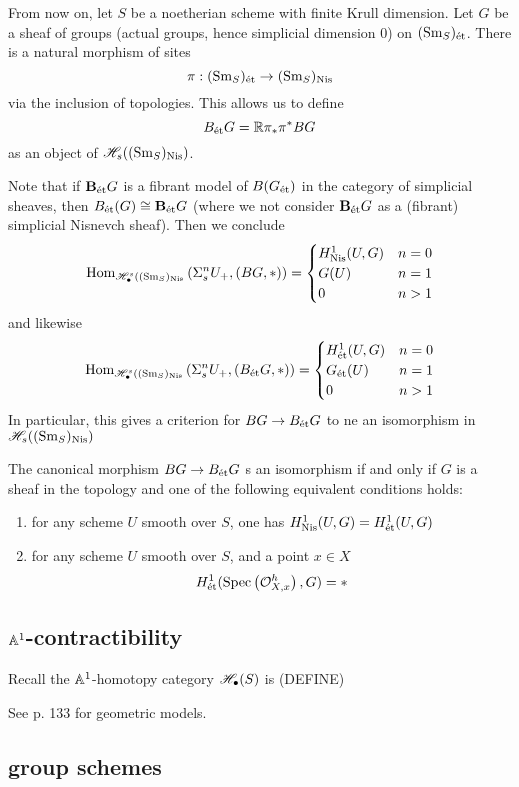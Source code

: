 \documentclass[12pt]{article}
\begin{document}
From now on, let $S$ be a noetherian scheme with finite Krull dimension. Let $G$ be a sheaf of groups (actual groups, hence simplicial dimension $0$) on $(\mathrm{Sm}_S)_{\text{\'{e}t}}$. There is a natural morphism of sites
\[ \pi: (\mathrm{Sm}_S)_{\text{\'{e}t}} \to (\mathrm{Sm}_S)_{\mathrm{Nis}} \]
via the inclusion of topologies. This allows us to define
\[ B_{\text{\'{e}t}} G = \mathbb{R} \pi_* \pi^* BG \]
as an object of $\mathscr{H}_s((\mathrm{Sm}_S)_{\mathrm{Nis}})$.
\par 
Note that if $\mathbf{B}_{\text{\'{e}t}} G$ is a fibrant model of $B(G_{\text{\'{e}t}})$ in the category of simplicial \etale sheaves, then $B_{\text{\'{e}t}}(G) \cong \mathbf{B}_{\text{\'{e}t}} G$ (where we not consider $\mathbf{B}_{\text{\'{e}t}} G$ as a (fibrant) simplicial Nisnevch sheaf). Then we conclude
\[ \mathrm{Hom}_{\mathscr{H}^s_\bullet((\mathrm{Sm}_S)_{\mathrm{Nis}}} \left( \Sigma_s^n U_+, (BG, *) \right) = 
\begin{cases}
H^1_{\mathrm{Nis}}(U, G) & n = 0
\\
G(U) & n = 1
\\
0 & n > 1
\end{cases} \]
and likewise
\[ \mathrm{Hom}_{\mathscr{H}^s_\bullet((\mathrm{Sm}_S)_{\mathrm{Nis}}} \left( \Sigma_s^n U_+, (B_{\text{\'{e}t}}G, *) \right) = 
\begin{cases}
H^1_{\text{\'{e}t}}(U, G) & n = 0
\\
G_{\text{\'{e}t}}(U) & n = 1
\\
0 & n > 1
\end{cases} \]
In particular, this gives a criterion for $BG \to B_{\text{\'{e}t}} G$ to ne an isomorphism in $\mathscr{H}_s((\mathrm{Sm}_S)_{\mathrm{Nis}})$

\begin{lemma}
The canonical morphism $BG \to B_{\text{\'{e}t}} G$ s an isomorphism if and only if $G$ is a sheaf in the \etale topology and one of the following equivalent conditions holds:
\begin{enumerate}
\item for any scheme $U$ smooth over $S$, one has $H^1_{\mathrm{Nis}}(U, G) = H^1_{\text{\'{e}t}}(U, G)$
\item for any scheme $U$ smooth over $S$, and a point $x \in X$ 
\[ H^1_{\text{\'{e}t}}(\mathrm{Spec}\left( \mathcal{O}_{X, x}^h \right), G) = * \] 
\end{enumerate}
\end{lemma}

\subsection{$\mathbb{A}^1$-contractibility}

Recall the $\mathbb{A}^1$-homotopy category $\mathscr{H}_\bullet(S)$ is (DEFINE)

See p. 133 for geometric models. 

\subsection{\etale group schemes}
\end{document}

